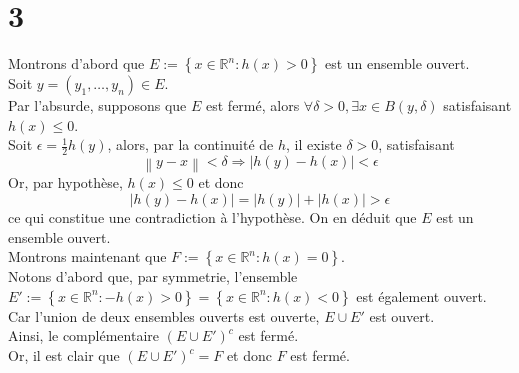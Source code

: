 \documentclass[11pt, a4paper]{article}
\newcommand\N[1]{\left\lVert#1\right\rVert}
\begin{document}
\section*{3}
Montrons d'abord que $ E:= \left\{ x \in \mathbb{R}^n: h( x) >0 \right\} $ est un ensemble ouvert.\\
Soit $ y= ( y_1, \ldots, y_n)  \in E$.\\
Par l'absurde, supposons que $E$ est fermé, alors $\forall \delta>0, \exists x \in B( y,\delta) $ satisfaisant $h( x) \leq 0$.\\
Soit $\epsilon= \frac{1}{2}h( y) $, alors, par la continuité de $h$, il existe $\delta>0$, satisfaisant
\[ 
	\N{y-x} < \delta \Rightarrow |h( y) -h( x)| < \epsilon
\]
Or, par hypothèse, $h( x) \leq 0$ et donc
\[ 
	|h( y) - h( x) | = |h( y) | + |h( x) | > \epsilon
\]
ce qui constitue une contradiction à l'hypothèse. On en déduit que $E$ est un ensemble ouvert.\\

Montrons maintenant que $ F:= \left\{ x \in \mathbb{R}^n: h( x) =0 \right\} $.\\
Notons d'abord que, par symmetrie, l'ensemble $ E':= \left\{ x \in \mathbb{R}^n: -h( x) >0 \right\} = \left\{ x \in \mathbb{R}^n: h( x) <0 \right\} $ est également ouvert.\\
Car l'union de deux ensembles ouverts est ouverte, $E \cup E'$ est ouvert.\\
Ainsi, le complémentaire $( E \cup E')^{c}$ est fermé.\\
Or, il est clair que $( E \cup E')^{c}= F $ et donc $F$ est fermé.
\end{document}
